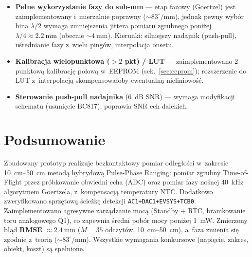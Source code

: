 \documentclass[a4paper,11pt]{article}
\begin{document}
\begin{itemize}[nosep]
	\item \textbf{Pełne wykorzystanie fazy do sub-mm} --- etap fazowy (Goertzel)
	jest zaimplementowany i~mierzalnie poprawny ($\sim83^\circ/\si{\milli\metre}$),
	jednak pewny wybór bina $\lambda/2$ wymaga zmniejszenia jittera pomiaru
	zgrubnego poniżej $\lambda/4\approx\SI{2,2}{\milli\metre}$ (obecnie
	${\sim}\SI{4}{\milli\metre}$). Kierunki: silniejszy nadajnik (push-pull),
	uśrednianie fazy z~wielu pingów, interpolacja onsetu.
	\item \textbf{Kalibracja wielopunktowa ($>2$ pkt) / LUT} --- zaimplementowano
	2-punktową kalibrację polową w~EEPROM (sek.~\ref{sec:eeprom}); rozszerzenie
	do LUT z~interpolacją skompensowałoby ewentualną nieliniowość.
	\item \textbf{Sterowanie push-pull nadajnika} (\SI{+6}{\deci\bel} SNR) ---
	wymaga modyfikacji schematu (usunięcie BC817); poprawia SNR ech dalekich.
\end{itemize}

\section{Podsumowanie}
\label{sec:podsumowanie}

Zbudowany prototyp realizuje bezkontaktowy pomiar odległości w~zakresie
\SIrange{10}{50}{\centi\metre} metodą hybrydową Pulse-Phase Ranging:
pomiar zgrubny Time-of-Flight przez próbkowanie obwiedni echa (ADC) oraz
pomiar fazy nośnej \SI{40}{\kilo\hertz} algorytmem Goertzela, z~kompensacją
temperatury NTC. Dodatkowo zweryfikowano sprzętową ścieżkę detekcji
\texttt{AC1+DAC1+EVSYS+TCB0}. Zaimplementowano agresywne zarządzanie mocą
(Standby + RTC, bramkowanie toru analogowego Q1), co zapewnia średni pobór
mocy poniżej \SI{1}{\milli\watt}. Zmierzony błąd \textbf{RMSE $\approx\SI{2,4}{\milli\metre}$}
($M=35$ odczytów, \SIrange{10}{50}{\centi\metre}), a~faza zmienia się zgodnie
z~teorią ($\sim83^\circ/\si{\milli\metre}$). Wszystkie wymagania konkursowe
(napięcie, zakres, obiekt, koszt) są spełnione.
\end{document}
